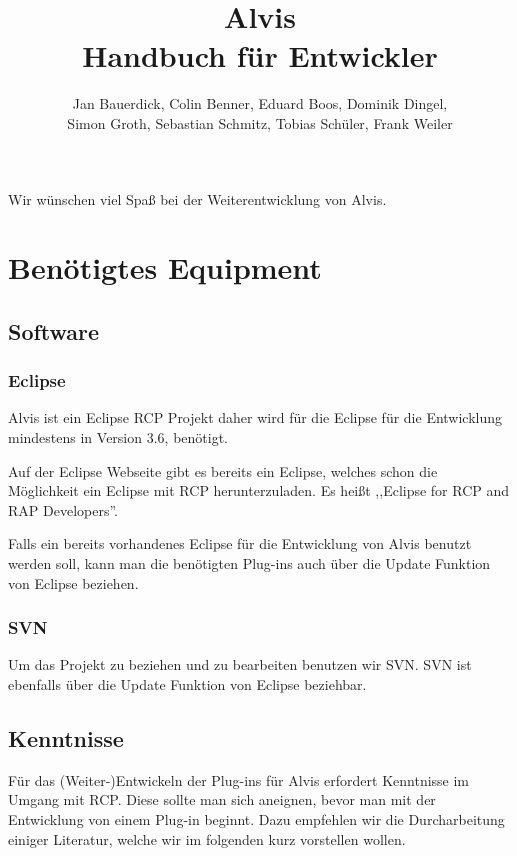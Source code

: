 \documentclass[10pt,a4paper,oneside]{scrbook}
\author{Jan Bauerdick,
Colin Benner,
Eduard Boos,
Dominik Dingel,\\
Simon Groth,
Sebastian Schmitz,
Tobias Schüler,
Frank Weiler}
\title{Alvis\\Handbuch für Entwickler}
\begin{document}
\maketitle
\newpage
\tableofcontents
\newpage
Wir wünschen viel Spaß bei der Weiterentwicklung von Alvis.
\chapter{Benötigtes Equipment}
\section{Software}
\subsection{Eclipse}
Alvis ist ein Eclipse RCP Projekt daher wird für die Eclipse für die Entwicklung mindestens in Version 3.6, benötigt.

Auf der Eclipse Webseite gibt es bereits ein Eclipse, welches schon die Möglichkeit ein Eclipse mit RCP herunterzuladen. Es heißt ,,Eclipse for RCP and RAP Developers''. 

Falls ein bereits vorhandenes Eclipse für die Entwicklung von Alvis benutzt werden soll, kann man die benötigten Plug-ins auch über die Update Funktion von Eclipse beziehen.
\subsection{SVN}
Um das Projekt zu beziehen und zu bearbeiten benutzen wir SVN. SVN ist ebenfalls über die Update Funktion von Eclipse beziehbar.

\section{Kenntnisse}
Für das (Weiter-)Entwickeln der Plug-ins für Alvis erfordert Kenntnisse im Umgang mit RCP. Diese sollte man sich aneignen, bevor man mit der Entwicklung von einem Plug-in beginnt. Dazu empfehlen wir die Durcharbeitung einiger Literatur, welche wir im folgenden kurz vorstellen wollen.
\end{document}
